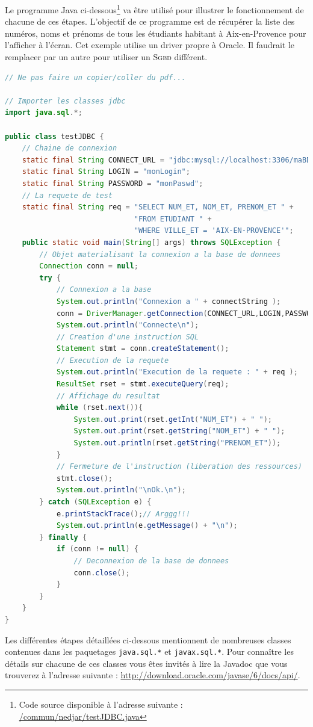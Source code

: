 \documentclass[a4paper,11pt]{article}
\begin{document}
Le programme Java ci-dessous\footnote{Code source disponible à l'adresse suivante : 
\url{/commun/nedjar/testJDBC.java}} va être utilisé pour illustrer le fonctionnement de chacune 
de ces étapes. L'objectif de ce programme est de récupérer la liste des numéros, noms et prénoms de tous les étudiants 
habitant à Aix-en-Provence pour l'afficher à l'écran. Cet exemple utilise un driver propre à 
Oracle. Il faudrait le remplacer par un autre pour utiliser un \textsc{Sgbd} différent.
\pagebreak
\begin{lstlisting}[language=java]
// Ne pas faire un copier/coller du pdf...

// Importer les classes jdbc
import java.sql.*;

public class testJDBC {
	// Chaine de connexion
	static final String CONNECT_URL = "jdbc:mysql://localhost:3306/maBD";
	static final String LOGIN = "monLogin";
	static final String PASSWORD = "monPaswd";
	// La requete de test
	static final String req = "SELECT NUM_ET, NOM_ET, PRENOM_ET " +
	                          "FROM ETUDIANT " +
	                          "WHERE VILLE_ET = 'AIX-EN-PROVENCE'";                                     
	public static void main(String[] args) throws SQLException {
		// Objet materialisant la connexion a la base de donnees
		Connection conn = null;
		try {
			// Connexion a la base
			System.out.println("Connexion a " + connectString );
			conn = DriverManager.getConnection(CONNECT_URL,LOGIN,PASSWORD);
			System.out.println("Connecte\n");
			// Creation d'une instruction SQL
			Statement stmt = conn.createStatement();
			// Execution de la requete
			System.out.println("Execution de la requete : " + req );
			ResultSet rset = stmt.executeQuery(req);
			// Affichage du resultat
			while (rset.next()){	
				System.out.print(rset.getInt("NUM_ET") + " ");
				System.out.print(rset.getString("NOM_ET") + " ");
				System.out.println(rset.getString("PRENOM_ET"));
			}
			// Fermeture de l'instruction (liberation des ressources)
			stmt.close();
			System.out.println("\nOk.\n");
		} catch (SQLException e) {
			e.printStackTrace();// Arggg!!!
			System.out.println(e.getMessage() + "\n");
		} finally {
			if (conn != null) {
				// Deconnexion de la base de donnees
				conn.close();
			}
		}
	}
}
\end{lstlisting}
Les différentes étapes détaillées ci-dessous mentionnent de nombreuses classes contenues dans les paquetages 
\texttt{java.sql.*} et \texttt{javax.sql.*}. Pour connaître les détails sur chacune de ces classes vous êtes 
invités à lire la Javadoc que vous trouverez à l'adresse suivante : \url{http://download.oracle.com/javase/6/docs/api/}.
\end{document}
